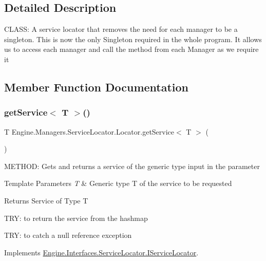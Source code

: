 \subsection{Detailed Description}
C\+L\+A\+SS\+: A service locator that removes the need for each manager to be a singleton. This is now the only Singleton required in the whole program. It allows us to access each manager and call the method from each Manager as we require it 



\subsection{Member Function Documentation}
\mbox{\label{a00542_a2bb3c0174bd67904d148bc789c9faaba}} 
\subsubsection{\texorpdfstring{get\+Service$<$ T $>$()}{getService< T >()}}
{\footnotesize\ttfamily T Engine.\+Managers.\+Service\+Locator.\+Locator.\+get\+Service$<$ T $>$ (\begin{DoxyParamCaption}{ }\end{DoxyParamCaption})\hspace{0.3cm}{\ttfamily [inline]}}



M\+E\+T\+H\+OD\+: Gets and returns a service of the generic type input in the parameter 


\begin{DoxyTemplParams}{Template Parameters}
{\em T} & Generic type T of the service to be requested\\
\hline
\end{DoxyTemplParams}
\begin{DoxyReturn}{Returns}
Service of Type T
\end{DoxyReturn}
T\+RY\+: to return the service from the hashmap

T\+RY\+: to catch a null reference exception 

Implements \hyperlink{a00474_a39ce84b8fb97655fd7039be3c4fa5f1c}{Engine.\+Interfaces.\+Service\+Locator.\+I\+Service\+Locator}.

